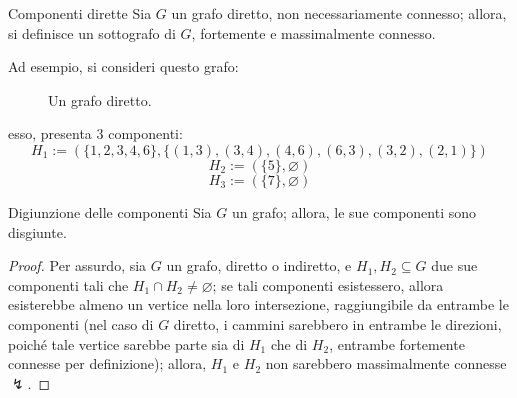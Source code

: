\documentclass[a4paper, 12pt]{report}
\begin{document}
    \begin{frameddefn}{Componenti dirette}
        Sia $G$ un grafo diretto, non necessariamente connesso; allora, si definisce  un sottografo di $G$, fortemente e massimalmente connesso.
    \end{frameddefn}

    \begin{example}
        Ad esempio, si consideri questo grafo:

        \begin{figure}[H]
            \centering
            \caption{Un grafo diretto.}
        \end{figure}

        esso, presenta $3$ componenti: $$H_1 := (\{1, 2, 3, 4, 6\}, \{(1, 3), (3, 4), (4, 6), (6, 3), (3, 2), (2, 1)\})$$ $$H_2 := (\{5\}, \varnothing)$$ $$H_3 := (\{7\}, \varnothing)$$
    \end{example}

    \begin{framedlem}[label={disjoint comps}]{Digiunzione delle componenti}
        Sia $G$ un grafo; allora, le sue componenti sono disgiunte.
    \end{framedlem}

    \begin{proof}
        Per assurdo, sia $G$ un grafo, diretto o indiretto, e $H_1, H_2 \subseteq G$ due sue componenti tali che $H_1 \cap H_2 \neq \varnothing$; se tali componenti esistessero, allora esisterebbe almeno un vertice nella loro intersezione, raggiungibile da entrambe le componenti (nel caso di $G$ diretto, i cammini sarebbero in entrambe le direzioni, poiché tale vertice sarebbe parte sia di $H_1$ che di $H_2$, entrambe fortemente connesse per definizione); allora, $H_1$ e $H_2$ non sarebbero massimalmente connesse $\lightning$.
    \end{proof}
\end{document}
